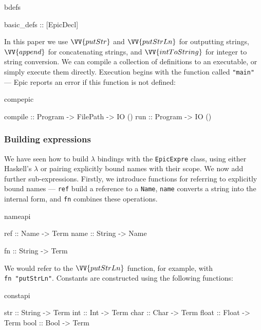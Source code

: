 \begin{SaveVerbatim}{bdefs}

basic_defs :: [EpicDecl]

\end{SaveVerbatim}

\noindent
In this paper we use $\VV{putStr}$ and $\VV{putStrLn}$ for outputting
strings, $\VV{append}$ for concatenating strings, and
$\VV{intToString}$ for integer to string conversion.
We can compile a collection of definitions to an executable, or simply
execute them directly. Execution begins with the function called
\texttt{"main"} --- Epic reports an error if this function is not
defined:

\begin{SaveVerbatim}{compepic}

compile :: Program -> FilePath -> IO ()
run     :: Program -> IO ()

\end{SaveVerbatim}

\subsubsection*{Building expressions}

We have seen how to build $\lambda$ bindings with the
\texttt{EpicExpre} class, using either Haskell's $\lambda$ or pairing
explicitly bound names with their scope. We now add further
sub-expressions. Firstly, we introduce functions for referring to
explicitly bound names --- \texttt{ref} build a reference to a
\texttt{Name}, \texttt{name} converts a string into the internal form,
and \texttt{fn} combines these operations.

\begin{SaveVerbatim}{nameapi}

ref  :: Name -> Term
name :: String -> Name

fn   :: String -> Term

\end{SaveVerbatim}

\noindent
We would refer to the $\VV{putStrLn}$ function, for example, with
\texttt{fn~"putStrLn"}.
Constants are constructed using the following functions:

\begin{SaveVerbatim}{constapi}

str   :: String -> Term
int   :: Int    -> Term
char  :: Char   -> Term
float :: Float  -> Term
bool  :: Bool   -> Term

\end{SaveVerbatim}

